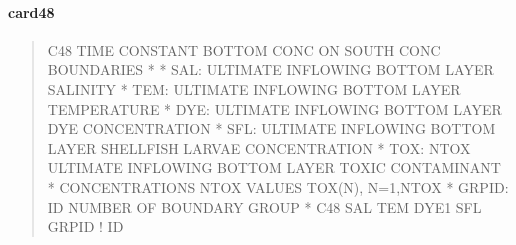 \documentclass[letterpaper,10pt,english]{sphinxmanual}
\begin{document}
\paragraph{card48}
\label{\detokenize{inputfiles/runcontrol/card48:card48}}\label{\detokenize{inputfiles/runcontrol/card48::doc}}\begin{quote}

\begin{sphinxVerbatim}[commandchars=\\\{\}]
\PYGZhy{}\PYGZhy{}\PYGZhy{}\PYGZhy{}\PYGZhy{}\PYGZhy{}\PYGZhy{}\PYGZhy{}\PYGZhy{}\PYGZhy{}\PYGZhy{}\PYGZhy{}\PYGZhy{}\PYGZhy{}\PYGZhy{}\PYGZhy{}\PYGZhy{}\PYGZhy{}\PYGZhy{}\PYGZhy{}\PYGZhy{}\PYGZhy{}\PYGZhy{}\PYGZhy{}\PYGZhy{}\PYGZhy{}\PYGZhy{}\PYGZhy{}\PYGZhy{}\PYGZhy{}\PYGZhy{}\PYGZhy{}\PYGZhy{}\PYGZhy{}\PYGZhy{}\PYGZhy{}\PYGZhy{}\PYGZhy{}\PYGZhy{}\PYGZhy{}\PYGZhy{}\PYGZhy{}\PYGZhy{}\PYGZhy{}\PYGZhy{}\PYGZhy{}\PYGZhy{}\PYGZhy{}\PYGZhy{}\PYGZhy{}\PYGZhy{}\PYGZhy{}\PYGZhy{}\PYGZhy{}\PYGZhy{}\PYGZhy{}\PYGZhy{}\PYGZhy{}\PYGZhy{}\PYGZhy{}\PYGZhy{}\PYGZhy{}\PYGZhy{}\PYGZhy{}\PYGZhy{}\PYGZhy{}\PYGZhy{}\PYGZhy{}\PYGZhy{}\PYGZhy{}\PYGZhy{}\PYGZhy{}\PYGZhy{}\PYGZhy{}\PYGZhy{}\PYGZhy{}\PYGZhy{}\PYGZhy{}
C48 TIME CONSTANT BOTTOM CONC ON SOUTH CONC BOUNDARIES
*
*    SAL: ULTIMATE INFLOWING BOTTOM LAYER SALINITY
*    TEM: ULTIMATE INFLOWING BOTTOM LAYER TEMPERATURE
*    DYE: ULTIMATE INFLOWING BOTTOM LAYER DYE CONCENTRATION
*    SFL: ULTIMATE INFLOWING BOTTOM LAYER SHELLFISH LARVAE CONCENTRATION
*    TOX: NTOX ULTIMATE INFLOWING BOTTOM LAYER TOXIC CONTAMINANT
*         CONCENTRATIONS NTOX VALUES TOX(N), N=1,NTOX
*  GRPID: ID NUMBER OF BOUNDARY GROUP
*
C48       SAL       TEM      DYE1       SFL      GRPID ! ID

\end{sphinxVerbatim}
\end{quote}
\end{document}
